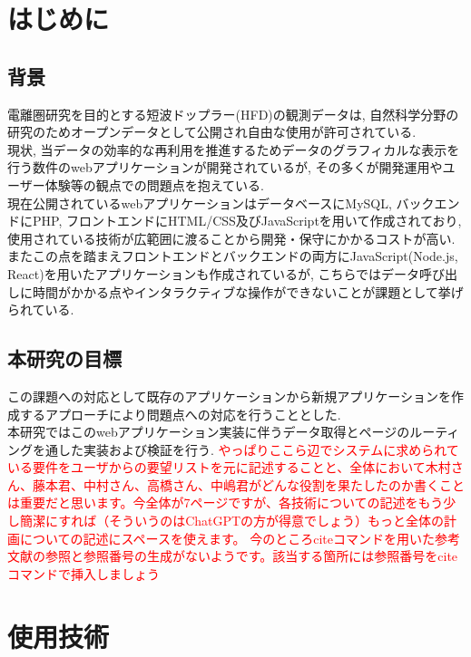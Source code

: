 \section{はじめに}
\subsection{背景}
電離圏研究を目的とする短波ドップラー(HFD)の観測データは, 自然科学分野の研究のためオープンデータとして公開され自由な使用が許可されている. \\
現状, 当データの効率的な再利用を推進するためデータのグラフィカルな表示を行う数件のwebアプリケーションが開発されているが, その多くが開発運用やユーザー体験等の観点での問題点を抱えている. \\
現在公開されているwebアプリケーションはデータベースにMySQL, バックエンドにPHP, フロントエンドにHTML/CSS及びJavaScriptを用いて作成されており, 使用されている技術が広範囲に渡ることから開発・保守にかかるコストが高い. \\
またこの点を踏まえフロントエンドとバックエンドの両方にJavaScript(Node.js, React)を用いたアプリケーションも作成されているが, こちらではデータ呼び出しに時間がかかる点やインタラクティブな操作ができないことが課題として挙げられている.

\subsection{本研究の目標}
この課題への対応として既存のアプリケーションから新規アプリケーションを作成するアプローチにより問題点への対応を行うこととした.\\
本研究ではこのwebアプリケーション実装に伴うデータ取得とページのルーティングを通した実装および検証を行う.
\textcolor{red}{やっぱりここら辺でシステムに求められている要件をユーザからの要望リストを元に記述することと、全体において木村さん、藤本君、中村さん、高橋さん、中嶋君がどんな役割を果たしたのか書くことは重要だと思います。今全体が7ページですが、各技術についての記述をもう少し簡潔にすれば（そういうのはChatGPTの方が得意でしょう）もっと全体の計画についての記述にスペースを使えます。}
\textcolor{red}{今のところciteコマンドを用いた参考文献の参照と参照番号の生成がないようです。該当する箇所には参照番号をciteコマンドで挿入しましょう}

\section{使用技術}
